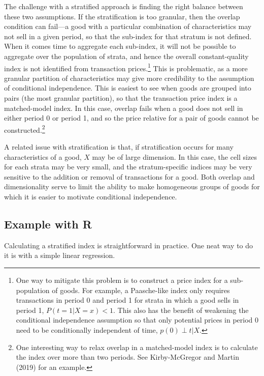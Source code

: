 \documentclass[]{article}
\begin{document}
The challenge with a stratified approach is finding the right balance between these two assumptions. If the stratification is too granular, then the overlap condition can fail---a good with a particular combination of characteristics may not sell in a given period, so that the sub-index for that stratum is not defined. When it comes time to aggregate each sub-index, it will not be possible to aggregate over the population of strata, and hence the overall constant-quality index is not identified from transaction prices.\footnote{One way to mitigate this problem is to construct a price index for a sub-population of goods. For example, a Paasche-like index only requires transactions in period 0 and period 1 for strata in which a good sells in period 1, \(P(t = 1 | X = x) < 1\). This also has the benefit of weakening the conditional independence assumption so that only potential prices in period 0 need to be conditionally independent of time, \(p(0) \perp t | X\).} This is problematic, as a more granular partition of characteristics may give more credibility to the assumption of conditional independence. This is easiest to see when goods are grouped into pairs (the most granular partition), so that the transaction price index is a matched-model index. In this case, overlap fails when a good does not sell in either period 0 or period 1, and so the price relative for a pair of goods cannot be constructed.\footnote{One interesting way to relax overlap in a matched-model index is to calculate the index over more than two periods. See Kirby-McGregor and Martin (2019) for an example.}

A related issue with stratification is that, if stratification occurs for many characteristics of a good, \(X\) may be of large dimension. In this case, the cell sizes for each strata may be very small, and the stratum-specific indices may be very sensitive to the addition or removal of transactions for a good. Both overlap and dimensionality serve to limit the ability to make homogeneous groups of goods for which it is easier to motivate conditional independence.

\hypertarget{example-with-r-2}{%
\subsection{Example with R}\label{example-with-r-2}}

Calculating a stratified index is straightforward in practice. One neat way to do it is with a simple linear regression.
\end{document}
